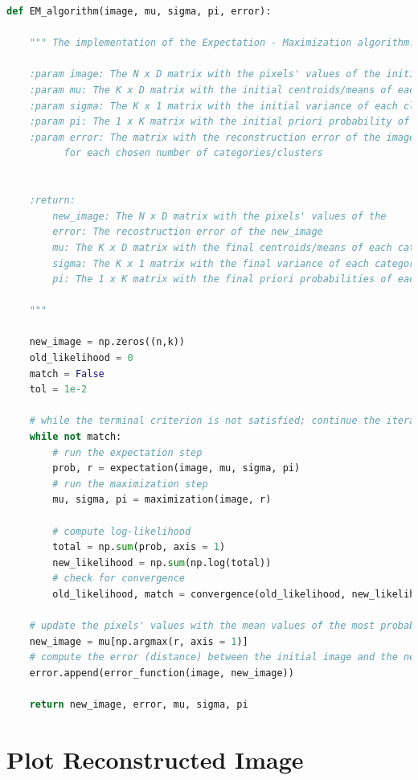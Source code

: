\documentclass[11pt]{article}
\begin{document}
\begin{lstlisting}[language = Python]
def EM_algorithm(image, mu, sigma, pi, error):
    
    """ The implementation of the Expectation - Maximization algorithm.
    
    :param image: The N x D matrix with the pixels' values of the initial image
    :param mu: The K x D matrix with the initial centroids/means of each             cluster
    :param sigma: The K x 1 matrix with the initial variance of each cluster
    :param pi: The 1 x K matrix with the initial priori probability of each          cluster
    :param error: The matrix with the reconstruction error of the images 
          for each chosen number of categories/clusters
          
          
    :return:
        new_image: The N x D matrix with the pixels' values of the                   reconstructed image
        error: The recostruction error of the new_image
        mu: The K x D matrix with the final centroids/means of each category
        sigma: The K x 1 matrix with the final variance of each category
        pi: The 1 x K matrix with the final priori probabilities of each             category
        
    """
    
    new_image = np.zeros((n,k))
    old_likelihood = 0
    match = False
    tol = 1e-2
    
    # while the terminal criterion is not satisfied; continue the iterations
    while not match:
        # run the expectation step
        prob, r = expectation(image, mu, sigma, pi)
        # run the maximization step
        mu, sigma, pi = maximization(image, r)
        
        # compute log-likelihood 
        total = np.sum(prob, axis = 1)
        new_likelihood = np.sum(np.log(total))
        # check for convergence
        old_likelihood, match = convergence(old_likelihood, new_likelihood, tol)
        
    # update the pixels' values with the mean values of the most probable      # category they belong to
    new_image = mu[np.argmax(r, axis = 1)]
    # compute the error (distance) between the initial image and the new one
    error.append(error_function(image, new_image))
    
    return new_image, error, mu, sigma, pi
    \end{lstlisting}
    \newpage
    
    \section{Plot Reconstructed Image}
    
\end{document}
